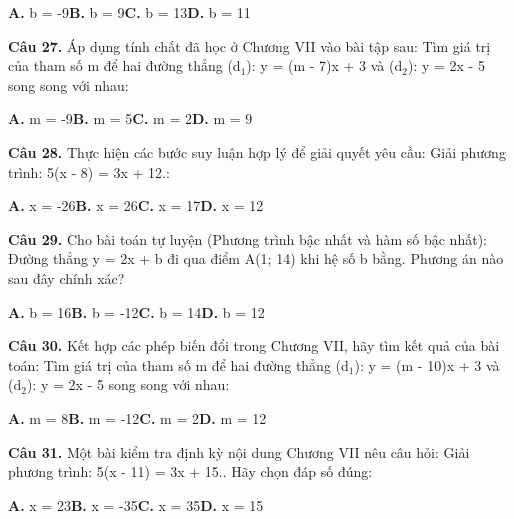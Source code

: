 \documentclass[11pt,a4paper]{article}
\begin{document}
\hspace*{1.5em}\textbf{A.} b = -9\quad\quad \textbf{B.} b = 9\quad\quad \textbf{C.} b = 13\quad\quad \textbf{D.} b = 11\par\vspace{2pt}
\textbf{\color{primary} Câu 27.} Áp dụng tính chất đã học ở Chương VII vào bài tập sau: Tìm giá trị của tham số m để hai đường thẳng (d$_1$): y = (m - 7)x + 3 và (d$_2$): y = 2x - 5 song song với nhau:\par
\hspace*{1.5em}\textbf{A.} m = -9\quad\quad \textbf{B.} m = 5\quad\quad \textbf{C.} m = 2\quad\quad \textbf{D.} m = 9\par\vspace{2pt}
\textbf{\color{primary} Câu 28.} Thực hiện các bước suy luận hợp lý để giải quyết yêu cầu: Giải phương trình: 5(x - 8) = 3x + 12.:\par
\hspace*{1.5em}\textbf{A.} x = -26\quad\quad \textbf{B.} x = 26\quad\quad \textbf{C.} x = 17\quad\quad \textbf{D.} x = 12\par\vspace{2pt}
\textbf{\color{primary} Câu 29.} Cho bài toán tự luyện (Phương trình bậc nhất và hàm số bậc nhất): Đường thẳng y = 2x + b đi qua điểm A(1; 14) khi hệ số b bằng. Phương án nào sau đây chính xác?\par
\hspace*{1.5em}\textbf{A.} b = 16\quad\quad \textbf{B.} b = -12\quad\quad \textbf{C.} b = 14\quad\quad \textbf{D.} b = 12\par\vspace{2pt}
\textbf{\color{primary} Câu 30.} Kết hợp các phép biến đổi trong Chương VII, hãy tìm kết quả của bài toán: Tìm giá trị của tham số m để hai đường thẳng (d$_1$): y = (m - 10)x + 3 và (d$_2$): y = 2x - 5 song song với nhau:\par
\hspace*{1.5em}\textbf{A.} m = 8\quad\quad \textbf{B.} m = -12\quad\quad \textbf{C.} m = 2\quad\quad \textbf{D.} m = 12\par\vspace{2pt}
\textbf{\color{primary} Câu 31.} Một bài kiểm tra định kỳ nội dung Chương VII nêu câu hỏi: Giải phương trình: 5(x - 11) = 3x + 15.. Hãy chọn đáp số đúng:\par
\hspace*{1.5em}\textbf{A.} x = 23\quad\quad \textbf{B.} x = -35\quad\quad \textbf{C.} x = 35\quad\quad \textbf{D.} x = 15\par\vspace{2pt}
\end{document}
